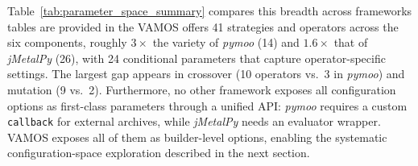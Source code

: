 \documentclass[final,5p,times,twocolumn]{elsarticle}
\newcommand{\VAMOS}{VAMOS}
\begin{document}
Table~\ref{tab:parameter_space_summary} compares this breadth across frameworks  tables  are provided in the  \VAMOS{} offers 41 strategies and operators across the six components, roughly $3\times$ the variety of \textit{pymoo} (14) and $1.6\times$ that of \textit{jMetalPy} (26), with 24 conditional parameters that capture operator-specific settings. The largest gap appears in crossover (10 operators vs.\ 3 in \textit{pymoo}) and mutation (9 vs.\ 2). Furthermore, no other framework exposes all configuration options as first-class parameters through a unified API: \textit{pymoo} requires a custom \texttt{callback} for external archives, while \textit{jMetalPy} needs an evaluator wrapper. \VAMOS{} exposes all of them as builder-level options, enabling the systematic configuration-space exploration described in the next section.
\end{document}
